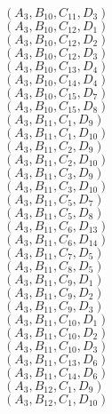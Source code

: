 \documentclass[14pt]{article}
\begin{document}
    $({A}_{3}, {B}_{10}, {C}_{11}, {D}_{3}) $ \\ 
    $({A}_{3}, {B}_{10}, {C}_{12}, {D}_{1}) $ \\ 
    $({A}_{3}, {B}_{10}, {C}_{12}, {D}_{2}) $ \\ 
    $({A}_{3}, {B}_{10}, {C}_{12}, {D}_{3}) $ \\ 
    $({A}_{3}, {B}_{10}, {C}_{13}, {D}_{4}) $ \\ 
    $({A}_{3}, {B}_{10}, {C}_{14}, {D}_{4}) $ \\ 
    $({A}_{3}, {B}_{10}, {C}_{15}, {D}_{7}) $ \\ 
    $({A}_{3}, {B}_{10}, {C}_{15}, {D}_{8}) $ \\ 
    $({A}_{3}, {B}_{11}, {C}_{1}, {D}_{9}) $ \\ 
    $({A}_{3}, {B}_{11}, {C}_{1}, {D}_{10}) $ \\ 
    $({A}_{3}, {B}_{11}, {C}_{2}, {D}_{9}) $ \\ 
    $({A}_{3}, {B}_{11}, {C}_{2}, {D}_{10}) $ \\ 
    $({A}_{3}, {B}_{11}, {C}_{3}, {D}_{9}) $ \\ 
    $({A}_{3}, {B}_{11}, {C}_{3}, {D}_{10}) $ \\ 
    $({A}_{3}, {B}_{11}, {C}_{5}, {D}_{7}) $ \\ 
    $({A}_{3}, {B}_{11}, {C}_{5}, {D}_{8}) $ \\ 
    $({A}_{3}, {B}_{11}, {C}_{6}, {D}_{13}) $ \\ 
    $({A}_{3}, {B}_{11}, {C}_{6}, {D}_{14}) $ \\ 
    $({A}_{3}, {B}_{11}, {C}_{7}, {D}_{5}) $ \\ 
    $({A}_{3}, {B}_{11}, {C}_{8}, {D}_{5}) $ \\ 
    $({A}_{3}, {B}_{11}, {C}_{9}, {D}_{1}) $ \\ 
    $({A}_{3}, {B}_{11}, {C}_{9}, {D}_{2}) $ \\ 
    $({A}_{3}, {B}_{11}, {C}_{9}, {D}_{3}) $ \\ 
    $({A}_{3}, {B}_{11}, {C}_{10}, {D}_{1}) $ \\ 
    $({A}_{3}, {B}_{11}, {C}_{10}, {D}_{2}) $ \\ 
    $({A}_{3}, {B}_{11}, {C}_{10}, {D}_{3}) $ \\ 
    $({A}_{3}, {B}_{11}, {C}_{13}, {D}_{6}) $ \\ 
    $({A}_{3}, {B}_{11}, {C}_{14}, {D}_{6}) $ \\ 
    $({A}_{3}, {B}_{12}, {C}_{1}, {D}_{9}) $ \\ 
    $({A}_{3}, {B}_{12}, {C}_{1}, {D}_{10}) $ \\ 
\end{document}
